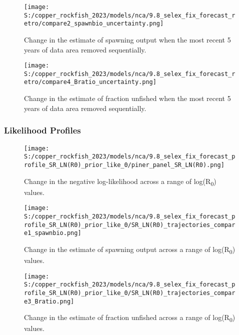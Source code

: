 \documentclass[11pt,
  english,
  letterpaper,
]{article}
\begin{document}
\newpage

\begin{figure}
\centering
\texttt{[image: S:/copper\_rockfish\_2023/models/nca/9.8\_selex\_fix\_forecast\_retro/compare2\_spawnbio\_uncertainty.png]}
\caption{Change in the estimate of spawning output when the most recent 5 years of data area removed sequentially.\label{fig:retro-ssb}}
\end{figure}

\pagebreak

\begin{figure}
\centering
\texttt{[image: S:/copper\_rockfish\_2023/models/nca/9.8\_selex\_fix\_forecast\_retro/compare4\_Bratio\_uncertainty.png]}
\caption{Change in the estimate of fraction unfished when the most recent 5 years of data area removed sequentially.\label{fig:retro-depl}}
\end{figure}

\pagebreak

\hypertarget{likelihood-profiles-1}{%
\subsubsection{Likelihood Profiles}\label{likelihood-profiles-1}}

\begin{figure}
\centering
\texttt{[image: S:/copper\_rockfish\_2023/models/nca/9.8\_selex\_fix\_forecast\_profile\_SR\_LN(R0)\_prior\_like\_0/piner\_panel\_SR\_LN(R0).png]}
\caption{Change in the negative log-likelihood across a range of log(R\textsubscript{0}) values.\label{fig:r0-profile}}
\end{figure}

\pagebreak

\begin{figure}
\centering
\texttt{[image: S:/copper\_rockfish\_2023/models/nca/9.8\_selex\_fix\_forecast\_profile\_SR\_LN(R0)\_prior\_like\_0/SR\_LN(R0)\_trajectories\_compare1\_spawnbio.png]}
\caption{Change in the estimate of spawning output across a range of log(R\textsubscript{0}) values.\label{fig:r0-ssb}}
\end{figure}

\pagebreak

\begin{figure}
\centering
\texttt{[image: S:/copper\_rockfish\_2023/models/nca/9.8\_selex\_fix\_forecast\_profile\_SR\_LN(R0)\_prior\_like\_0/SR\_LN(R0)\_trajectories\_compare3\_Bratio.png]}
\caption{Change in the estimate of fraction unfished across a range of log(R\textsubscript{0}) values.\label{fig:r0-depl}}
\end{figure}
\end{document}
